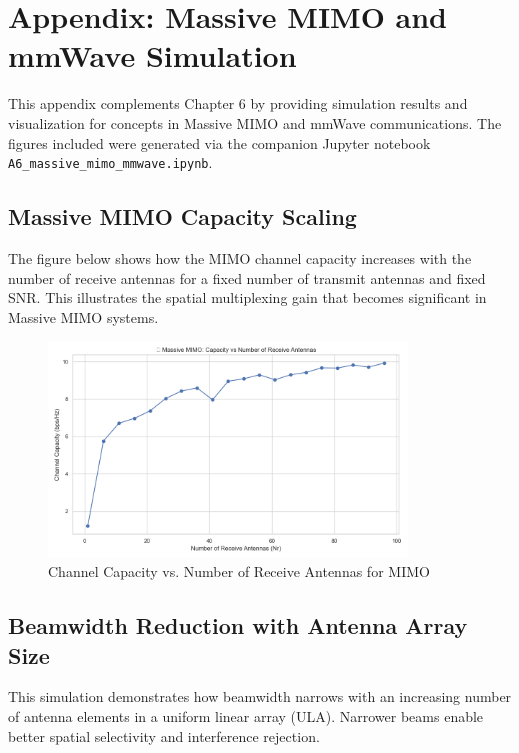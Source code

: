 \section{Appendix: Massive MIMO and mmWave Simulation}

This appendix complements Chapter 6 by providing simulation results and visualization for concepts in Massive MIMO and mmWave communications. The figures included were generated via the companion Jupyter notebook \texttt{A6\_massive\_mimo\_mmwave.ipynb}.

\subsection{Massive MIMO Capacity Scaling}

The figure below shows how the MIMO channel capacity increases with the number of receive antennas for a fixed number of transmit antennas and fixed SNR. This illustrates the spatial multiplexing gain that becomes significant in Massive MIMO systems.

\begin{figure}[h]
    \centering
    \includegraphics[width=0.85\textwidth]{figures/massive_mimo_capacity.png}
    \caption{Channel Capacity vs. Number of Receive Antennas for MIMO}
    \label{fig:mimo_capacity}
\end{figure}

\subsection{Beamwidth Reduction with Antenna Array Size}

This simulation demonstrates how beamwidth narrows with an increasing number of antenna elements in a uniform linear array (ULA). Narrower beams enable better spatial selectivity and interference rejection.

